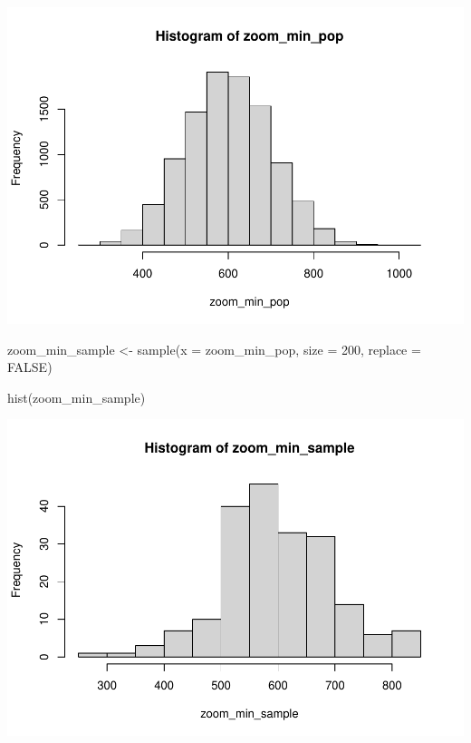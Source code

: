 \documentclass[
]{book}
\newenvironment{Shaded}{\begin{snugshade}}{\end{snugshade}}
\newcommand{\AttributeTok}[1]{\textcolor[rgb]{0.77,0.63,0.00}{#1}}
\newcommand{\ConstantTok}[1]{\textcolor[rgb]{0.00,0.00,0.00}{#1}}
\newcommand{\DecValTok}[1]{\textcolor[rgb]{0.00,0.00,0.81}{#1}}
\newcommand{\FunctionTok}[1]{\textcolor[rgb]{0.00,0.00,0.00}{#1}}
\newcommand{\NormalTok}[1]{#1}
\newcommand{\OtherTok}[1]{\textcolor[rgb]{0.56,0.35,0.01}{#1}}
\begin{document}
\includegraphics{test_course_notes_files/figure-latex/unnamed-chunk-18-1.pdf}

\begin{Shaded}
\begin{Highlighting}[]
\NormalTok{zoom\_min\_sample }\OtherTok{\textless{}{-}} \FunctionTok{sample}\NormalTok{(}\AttributeTok{x =}\NormalTok{ zoom\_min\_pop,}
                          \AttributeTok{size =} \DecValTok{200}\NormalTok{,}
                          \AttributeTok{replace =} \ConstantTok{FALSE}\NormalTok{)}


\FunctionTok{hist}\NormalTok{(zoom\_min\_sample)}
\end{Highlighting}
\end{Shaded}

\includegraphics{test_course_notes_files/figure-latex/unnamed-chunk-18-2.pdf}
\end{document}
